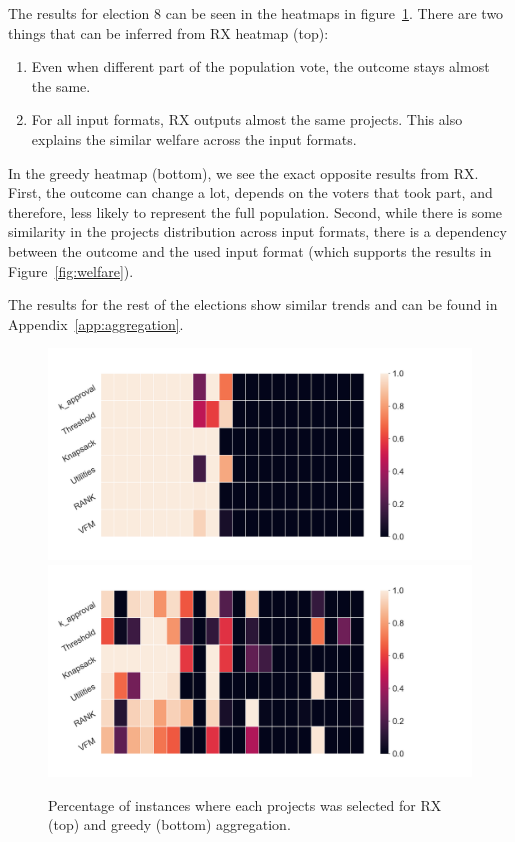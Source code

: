 \documentclass[10pt]{article}
\begin{document}
The results for election 8 can be seen in the heatmaps in figure~\ref{fig:heatmap}. There are two things that can be inferred from RX heatmap (top):
\begin{enumerate}
    \item Even when different part of the population vote, the outcome stays almost the same.
    \item For all input formats, RX outputs almost the same projects. This also explains the similar welfare across the input formats.
\end{enumerate}

In the greedy heatmap (bottom), we see the exact opposite results from RX. First, the outcome can change a lot, depends on the voters that took part, and therefore, less likely to represent the full population. Second, while there is some similarity in the projects distribution across input formats, there is a dependency between the outcome and the used input format (which supports the results in Figure~\ref{fig:welfare}).

The results for the rest of the elections show similar trends and can be found in Appendix~\ref{app:aggregation}.

\begin{figure}[!htbp]
\begin{center}
\includegraphics[width=18cm]{experiment/election_8_rx.png}
\includegraphics[width=18cm]{experiment/election_8_greedy.png}

\caption{Percentage of instances where each projects was selected for RX (top) and greedy (bottom) aggregation.
}\label{fig:heatmap}
\end{center}
\end{figure}
\end{document}
